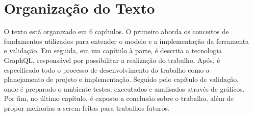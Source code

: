 \section[Organização do Texto]{Organização do Texto}

O texto está organizado em 6 capítulos. O primeiro aborda os conceitos de fundamentos utilizados para entender o modelo e a implementação da ferramenta e validação. Em seguida, em um capítulo à parte, é descrita a tecnologia GraphQL, responsável por possibilitar a realização do trabalho. Após, é especificado todo o processo de desenvolvimento do trabalho como o planejamento de projeto e implementação. Seguido pelo capítulo de validação, onde é preparado o ambiente testes, executados e analisados através de gráficos. Por fim, no último capítulo, é exposto a conclusão sobre o trabalho, além de propor melhorias a serem feitas para trabalhos futuros.
